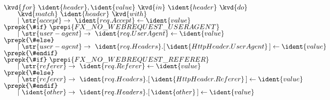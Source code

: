 
\begin{figure}
\begin{equation*}
\begin{array}{l}
\kvd{for}~\ident{header},\ident{value}~\kvd{in}~\ident{header}~\kvd{do}\\[-0.25em]
\hspace{2em}\kvd{match}~\ident{header}~\kvd{with}\\[-0.25em]
\hspace{2em}|~\str{accept} \rightarrow~ \ident{req.Accept} \leftarrow \ident{value}\\[-0.25em]
%
\prepk{\#if}~\prepi{FX\_NO\_WEBREQUEST\_USERAGENT}\\[-0.25em]
\hspace{2em}|~\str{user-agent} \rightarrow~ \ident{req.UserAgent} \leftarrow \ident{value}\\[-0.25em]
\prepk{\#else}\\[-0.25em]
\hspace{2em}|~\str{user-agent} \rightarrow~
  \ident{req.Headers}.[\,\ident{HttpHeader.UserAgent}\,] \leftarrow \ident{value}\\[-0.25em]
\prepk{\#endif}\\[-0.25em]
%
\prepk{\#if}~\prepi{FX\_NO\_WEBREQUEST\_REFERER}\\[-0.25em]
\hspace{2em}|~\str{referer} \rightarrow~ \ident{req.Referer} \leftarrow \ident{value}\\[-0.25em]
\prepk{\#else}\\[-0.25em]
\hspace{2em}|~\str{referer} \rightarrow~
  \ident{req.Headers}.[\,\ident{HttpHeader.Referer}\,] \leftarrow \ident{value}\\[-0.25em]
\prepk{\#endif}\\[-0.25em]
%
\hspace{2em}|~\ident{other} \rightarrow~ \ident{req.Headers}.[\,\ident{other}\,] \leftarrow \ident{value}\\[-0.25em]
\end{array}
\end{equation*}

\label{fig:introduction-context-http}
\end{figure}


